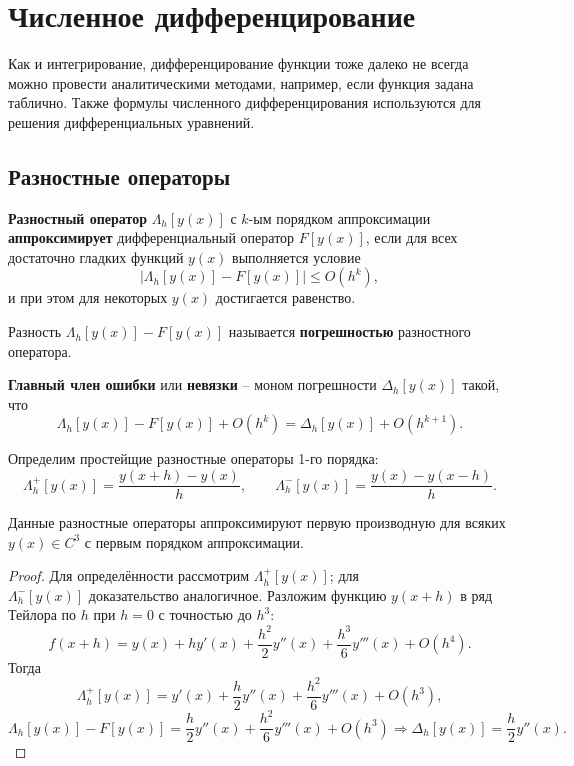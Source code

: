 \documentclass[../main.tex]{subfile}
\begin{document}
\section{Численное дифференцирование}
Как и интегрирование, дифференцирование функции тоже далеко не всегда можно
провести аналитическими методами, например, если функция задана таблично. Также
формулы численного дифференцирования используются для решения дифференциальных
уравнений.

\subsection{Разностные операторы}
\begin{define}\label{eq:difference_operator}
	\textbf{Разностный оператор} $\Lambda_h[y(x)]$ с $k$-ым порядком
	аппроксимации \textbf{аппроксимирует} дифференциальный оператор
	$F[y(x)]$, если для всех достаточно гладких функций $y(x)$ выполняется
	условие
	\[\big|\Lambda_h[y(x)]-F[y(x)]\big|\le O(h^k),\]
	и при этом для некоторых $y(x)$ достигается равенство.
\end{define}

\begin{define}
	Разность $\Lambda_h[y(x)]-F[y(x)]$ называется \textbf{погрешностью}
	разностного оператора.
\end{define}

\begin{define}
	\textbf{Главный член ошибки} или \textbf{невязки} -- моном погрешности
	$\Delta_h[y(x)]$ такой, что
	\[\Lambda_h[y(x)]-F[y(x)]+O(h^k)=\Delta_h[y(x)]+O(h^{k+1}).\]
\end{define}

\begin{define} \label{eq:simplest_difference_operators}
	Определим простейщие разностные операторы 1-го порядка:
	\[\Lambda_h^+[y(x)]=\frac{y(x+h)-y(x)}{h},\qquad
	\Lambda_h^-[y(x)]=\frac{y(x)-y(x-h)}{h}.\]
\end{define}
\newpage

\begin{lemma}
	Данные разностные операторы аппроксимируют первую производную для всяких
	$y(x)\in C^3$ с первым порядком аппроксимации.
\end{lemma}

\begin{proof}
	Для определённости рассмотрим $\Lambda_h^+[y(x)]$; для \\
	$\Lambda_h^-[y(x)]$ доказательство аналогичное. Разложим функцию
	$y(x+h)$ в ряд Тейлора по $h$ при $h=0$ с точностью до $h^3$:
	\[f(x+h)=y(x)+hy'(x)+\frac{h^2}{2}y''(x)+\frac{h^3}{6}y'''(x)
	+O(h^4).\]
	Тогда
	\[\Lambda_h^+[y(x)]=y'(x)+\frac{h}{2}y''(x)+\frac{h^2}{6}
	y'''(x)+O(h^3),\]
	\[\Lambda_h[y(x)]-F[y(x)]=\frac{h}{2}y''(x)+\frac
	{h^2}{6}y'''(x)+O(h^3)\Rightarrow \Delta_h[y(x)]=\frac{h}{2}y''(x).\]
\end{proof}
\end{document}
